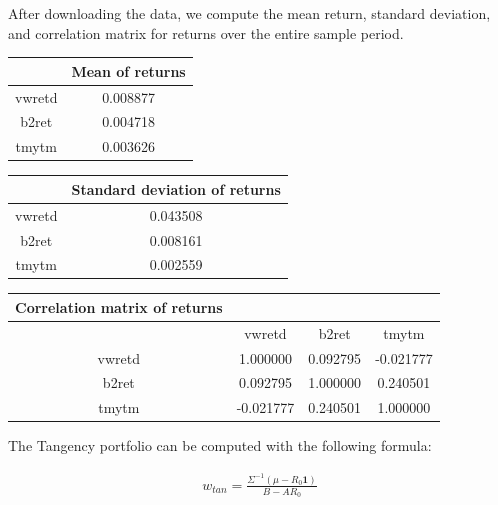 \documentclass[10pt]{article}
\newenvironment{exercise}[2][Exercise]{\begin{trivlist}
  \item[\hskip \labelsep {\bfseries #1}\hskip \labelsep {\bfseries #2.}]}{\end{trivlist}}
\begin{document}
\begin{exercise}{3}

	After downloading the data, we compute the mean return, standard deviation, and correlation matrix for returns over the entire sample period.
	
	\begin{table}[h!]
		\centering
 		\begin{tabular}{||c c||} 
 			\hline
 			& Mean of returns \\ [0.5ex] 
 			\hline\hline
 			vwretd & 0.008877 \\ 
 			b2ret & 0.004718 \\
 			tmytm & 0.003626 \\ [1ex] 
 			\hline
		 \end{tabular}
	\end{table}
	
	\begin{table}[h!]
		\centering
 		\begin{tabular}{||c c||} 
 			\hline
 			& Standard deviation of returns \\ [0.5ex] 
 			\hline\hline
 			vwretd & 0.043508 \\ 
 			b2ret & 0.008161 \\
 			tmytm & 0.002559 \\ [1ex] 
 			\hline
		 \end{tabular}
	\end{table}
	
	\begin{table}[h!]
		\centering
 		\begin{tabular}{||c c c c||} 
 			\hline
 			Correlation matrix of returns & & &  \\ [0.5ex] 
 			\hline\hline
 			& vwretd & b2ret & tmytm \\
 			vwretd & 1.000000 & 0.092795 & -0.021777 \\ 
 			b2ret & 0.092795 & 1.000000 & 0.240501 \\
 			tmytm & -0.021777 & 0.240501 & 1.000000\\ [1ex] 
 			\hline
		 \end{tabular}
	\end{table}
	
	The Tangency portfolio can be computed with the following formula:
	
	\begin{align*}
		w_{tan} = \frac{\Sigma^{-1}(\mu - R_{0}\textbf{1})}{B - AR_{0}}		
	\end{align*}
	

\end{exercise}
\end{document}
